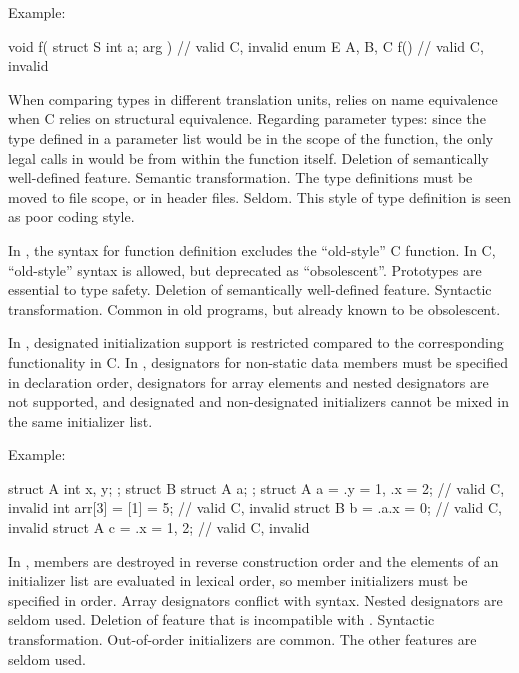 Example:
\begin{codeblock}
void f( struct S { int a; } arg ) {}    // valid C, invalid \Cpp{}
enum E { A, B, C } f() {}               // valid C, invalid \Cpp{}
\end{codeblock}

\rationale
When comparing types in different translation units, \Cpp{} relies
on name equivalence when C relies on structural equivalence.
Regarding parameter types: since the type defined in a parameter list
would be in the scope of the function, the only legal calls in \Cpp{}
would be from within the function itself.
\effect
Deletion of semantically well-defined feature.
\difficulty
Semantic transformation.
The type definitions must be moved to file scope, or in header files.
\howwide
Seldom.
This style of type definition is seen as poor coding style.

\change
In \Cpp{}, the syntax for function definition excludes the ``old-style'' C function.
In C, ``old-style'' syntax is allowed, but deprecated as ``obsolescent''.
\rationale
Prototypes are essential to type safety.
\effect
Deletion of semantically well-defined feature.
\difficulty
Syntactic transformation.
\howwide
Common in old programs, but already known to be obsolescent.

\change
In \Cpp{}, designated initialization support is restricted
compared to the corresponding functionality in C\@.
In \Cpp{},
designators for non-static data members
must be specified in declaration order,
designators for array elements and nested designators
are not supported,
and
designated and non-designated initializers
cannot be mixed in the same initializer list.

Example:
\begin{codeblock}
struct A { int x, y; };
struct B { struct A a; };
struct A a = {.y = 1, .x = 2};  // valid C, invalid \Cpp{}
int arr[3] = {[1] = 5};         // valid C, invalid \Cpp{}
struct B b = {.a.x = 0};        // valid C, invalid \Cpp{}
struct A c = {.x = 1, 2};       // valid C, invalid \Cpp{}
\end{codeblock}
\rationale
In \Cpp{}, members are destroyed in reverse construction order
and the elements of an initializer list are evaluated in lexical order,
so member initializers must be specified in order.
Array designators conflict with  syntax.
Nested designators are seldom used.
\effect
Deletion of feature that is incompatible with \Cpp{}.
\difficulty
Syntactic transformation.
\howwide
Out-of-order initializers are common.
The other features are seldom used.

